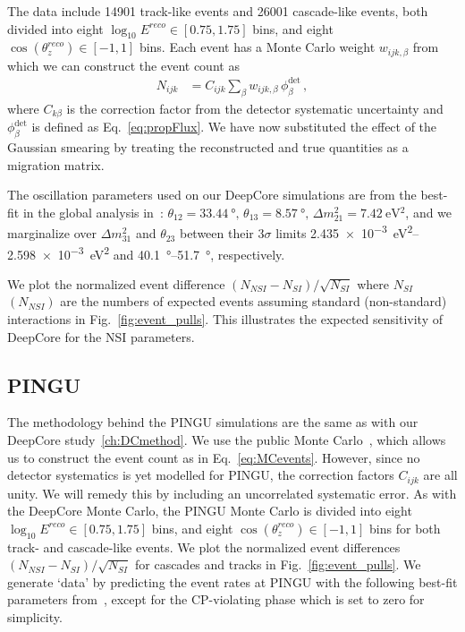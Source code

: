 \documentclass[draft=True]{revtex4-2}
\newcommand{\zreco}{\ensuremath{\cos{(\theta_z^{reco})}}}
\newcommand{\dm}{\Delta m^2_{31}}
\begin{document}
The data include 14901 track-like events and 26001 cascade-like events, both divided into eight 
$ \log_{10}E^{reco} \in [0.75,1.75]$ bins, and eight $\zreco \in [-1,1]$ bins. Each event has a Monte Carlo weight $w_{ijk,\beta}$
from which we can construct the event count as
\begin{align}\label{eq:MCevents}
    N_{ijk} &= C_{ijk}\sum_{\beta}w_{ijk,\beta}\, \phi_\beta^\text{det}\,,
\end{align}
where $C_{k\beta}$ is the correction factor from the detector systematic uncertainty and $\phi_\beta^\text{det}$ is defined as Eq.~\ref{eq:propFlux}. We have now substituted the effect of the Gaussian smearing 
by treating the reconstructed and true quantities as a migration matrix. 

The oscillation parameters used on our DeepCore simulations are from the
best-fit in the global analysis in~\cite{nufit}: $\theta_{12} = \SI{33.44}{\degree},\, \theta_{13} = \SI{8.57}{\degree},\, \Delta m^2_{21} =  \SI{7.42}{\electronvolt^2}$, and we 
marginalize over $\dm$ and $\theta_{23}$ between their $3\sigma$ limits \SIrange{2.435e-3}{2.598e-3}{\eV \squared} and \SIrange{40.1}{51.7}{\degree}, respectively.

We plot the normalized event difference $(N_{NSI} - N_{SI})/\sqrt{N_{SI}}$ where $N_{SI}$ $(N_{NSI})$ are the numbers of expected events
assuming standard (non-standard) interactions in Fig.~\ref{fig:event_pulls}. This illustrates the expected sensitivity of DeepCore for the NSI parameters.

\subsection{PINGU}\label{ch:PINGUmethod}
The methodology behind the PINGU simulations are the same as with our DeepCore study~\ref{ch:DCmethod}. We use the public Monte Carlo~\cite{PINGUdata}, which allows us to construct the event count as in Eq.~\ref{eq:MCevents}.
However, since no detector systematics is yet modelled for PINGU, the correction factors $C_{ijk}$ are all unity. We will remedy this by including an uncorrelated systematic error.
As with the DeepCore Monte Carlo, the PINGU Monte Carlo is divided into eight 
$\log_{10}E^{reco} \in [0.75,1.75]$ bins, and eight $\zreco \in [-1,1]$ bins for both track- and cascade-like events. 
We plot the normalized event differences $(N_{NSI} - N_{SI})/\sqrt{N_{SI}}$ for cascades and tracks in Fig.~\ref{fig:event_pulls}. %
We generate `data' by predicting the event rates at PINGU with the following best-fit parameters from~\cite{nufit}, except for the CP-violating phase which is set to zero for simplicity.
\end{document}
